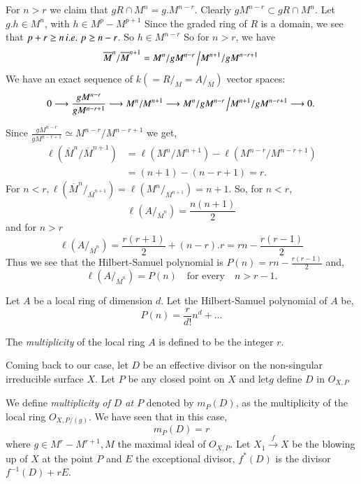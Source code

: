 For $n>r$ we claim that $gR\cap M^n=g. M^{n-r}$. Clearly
$gM^{n-r}\subset gR\cap M^n$. Let $g.h\in M^n$, with $h\in
M^p-M^{p+1}$ Since the graded ring of $R$ is a domain, we see that
$p+r\geq n\,{i.e.}\kern.3em p\geq n-r$. So $h\in M^{n-r}$ So for $n>r$, we have 
$$
\overline{M}^n/\overline{M}^{n+1} = M^n/gM^{n-r} \left/
M^{n+1}/gM^{n-r+1}  \right.
$$
We have an exact sequence of $k(=R/_M=A/_{\overline{M}})$ vector
spaces:
$$
0\longrightarrow\frac{gM^{n-r}}{gM^{n-r+1}} \longrightarrow
M^n/M^{n+1} \longrightarrow M^n/gM^{n-r} \left/M^{n+1}/gM^{n-r+1}
\longrightarrow 0. \right.
$$\pageoriginale

Since $\frac{gM^{n-r}}{gM^{n-r+1}}\simeq M^{n-r}/M^{n-r+1}$ we get,
\begin{align*}
\ell(\overline{M}^n/\overline{M}^{n+1}) &= \ell(M^n/M^{n+1})-
\ell(M^{n-r}/M^{n-r+1})\\
&= (n+1)-(n-r+1)=r.
\end{align*}
For $n<r, \ell(\overline{M}^n/_{\overline{M}^{n+1}})=\ell
(M^n/_{M^{n+1}})=n+1$. So, for $n<r$,
$$
\ell(A/_{\overline{M}^n})=\frac{n(n+1)}{2}
$$
and for $n>r$
$$
\ell(A/_{\overline{M}^n})=\frac{r(r+1)}{2}+(n-r).r=rn-\frac{r(r-1)}{2} 
$$
Thus we see that the Hilbert-Samuel polynomial is
$P(n)=rn-\frac{r(r-1)}{2}$ and, 
$$
\ell(A/_{\overline{M}^n})=P(n)\quad\text{for every}\quad n>r-1.
$$

Let $A$ be a local ring of dimension $d$. Let the Hilbert-Samuel
polynomial of $A$ be,
$$
P(n)=\frac{r}{d!}n^d+\ldots 
$$

\begin{def*}
The {\it multiplicity} of the local ring $A$ is defined to be the
integer $r$.

Coming back to our case, let $D$ be an effective divisor on the
non-singular irreducible surface $X$. Let $P$ be any closed point on
$X$ and let\pageoriginale $g$ define $D$ in $O_{X,P}$
\end{def*}

\begin{def*}
We define {\it multiplicity of $D$ at $P$} denoted by $m_P(D)$, as the
multiplicity of the local ring $O_{X,P/(g)}$. We have seen that in
this case,
$$
m_P(D)=r
$$
where $g\in M^r-M^{r+1}, M$ the maximal ideal of $O_{X,P}$. Let $X_1
\xrightarrow{f} X$ be the blowing up of $X$ at the point $P$ and $E$
the exceptional divisor, $f^*(D)$ is the divisor $f^{-1}(D)+rE$.
\end{def*}

